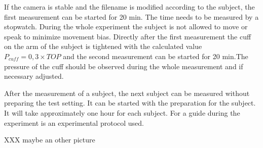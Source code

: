 If the camera is stable and the filename is modified according to the subject, the first measurement can be started for 20 min. The time needs to be measured by a stopwatch. During the whole experiment the subject is not allowed to move or speak to minimize movement bias.
Directly after the first measurement the cuff on the arm of the subject is tightened with the calculated value $P_{cuff}=0,3\times TOP$ and the second measurement can be started for 20 min.The pressure of the cuff should be observed during the whole measurement and if necessary adjusted.

After the measurement of a subject, the next subject can be measured without preparing the test setting. It can be started with the preparation for the subject. It will take approximately one hour for each subject. For a guide during the experiment is an experimental protocol used.

XXX maybe an other picture
